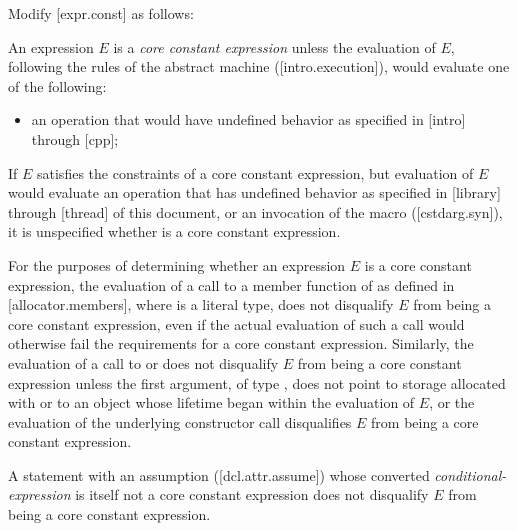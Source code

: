 Modify [expr.const] as follows:

\begin{adjustwidth}{0.5cm}{0.5cm}

An expression $E$ is a \emph{core constant expression} unless the evaluation of $E$, following the rules of the abstract machine ([intro.execution]), would evaluate one of the following:
\begin{itemize}
\item an operation that would have undefined behavior as specified in [intro] through [cpp];
\end{itemize}

If $E$ satisfies the constraints of a core constant expression, but evaluation of $E$ would evaluate an operation that has undefined behavior as specified in [library] through [thread] of this document, or an invocation of the  macro ([cstdarg.syn]), it is unspecified whether  is a core constant expression.

For the purposes of determining
whether an expression $E$ is a core constant expression,
the evaluation of a call to a member function of 
as defined in [allocator.members], where  is a literal type,
does not disqualify $E$ from being a core constant expression,
even if the actual evaluation of such a call
would otherwise fail the requirements for a core constant expression.
Similarly, the evaluation of a call to
 or 
does not disqualify $E$
from being a core constant expression unless
the first argument, of type , does not point
to storage allocated with  or
to an object whose lifetime began within the evaluation of $E$, or
the evaluation of the underlying constructor call
disqualifies $E$ from being a core constant expression.

\begin{addedblock}
\begin{note}
A statement with an assumption ([dcl.attr.assume]) whose converted \textit{conditional-expression} is itself not a core constant expression does not disqualify $E$ from being a core constant expression.
\end{note}
\end{addedblock}

\end{adjustwidth}

